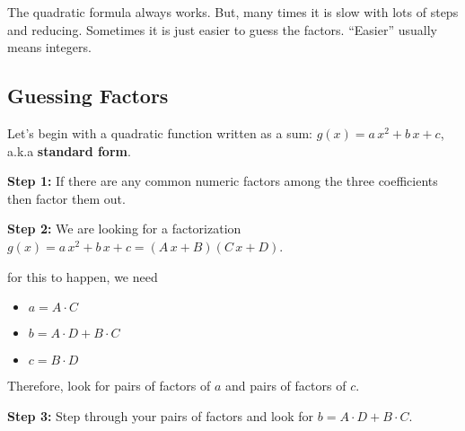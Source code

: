\documentclass{ximera}
\begin{document}
The quadratic formula always works.  But, many times it is slow with lots of steps and reducing.  Sometimes it is just easier to guess the factors.  ``Easier'' usually means integers.




















\subsection*{Guessing Factors}


Let's begin with a quadratic function written as a sum: $g(x) = a \, x^2 + b \, x + c$, a.k.a \textbf{standard form}.  


\textbf{\textcolor{blue!75!black}{Step 1:}} If there are any common numeric factors among the three coefficients then factor them out.


\textbf{\textcolor{blue!75!black}{Step 2:}} We are looking for a factorization $g(x) = a \, x^2 + b \, x + c = (A \, x + B)(C \, x + D)$.

for this to happen, we need

\begin{itemize}
\item $a = A \cdot C $
\item $b = A\cdot D + B \cdot C$
\item $c = B \cdot D$
\end{itemize}

Therefore, look for pairs of factors of $a$ and pairs of factors of $c$.






\textbf{\textcolor{blue!75!black}{Step 3:}} Step through your pairs of factors and look for $b = A \cdot D + B \cdot C$.
\end{document}
